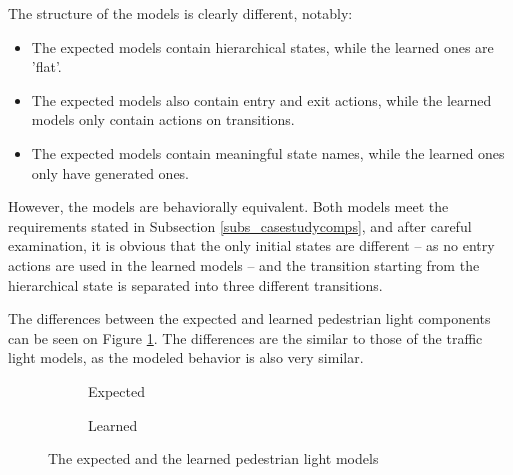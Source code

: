 The structure of the models is clearly different, notably:
\begin{itemize}
	\item The expected models contain hierarchical states, while the learned ones are 'flat'.
	\item The expected models also contain entry and exit actions, while the learned models only contain actions on transitions. 
	\item The expected models contain meaningful state names, while the learned ones only have generated ones.
\end{itemize}

However, the models are behaviorally equivalent. Both models meet the requirements stated in Subsection \ref{subs_casestudycomps}, and after careful examination, it is obvious that the only initial states are different -- as no entry actions are used in the learned models -- and the transition starting from the hierarchical state is separated into three different transitions.

The differences between the expected and learned pedestrian light components can be seen on Figure \ref{fig_casestudy_pedestrianlightdiff}. The differences are the similar to those of the traffic light models, as the modeled behavior is also very similar. 

\begin{figure}[!ht] 
	\centering
	\begin{subfigure}[b]{0.9\textwidth}
		\centering
		\caption{Expected}
	\end{subfigure}
	\hfill
	\begin{subfigure}[b]{0.9\textwidth}
		\centering
		\caption{Learned}	
	\end{subfigure}
	\caption{The expected and the learned pedestrian light models}
	\label{fig_casestudy_pedestrianlightdiff}
\end{figure}

